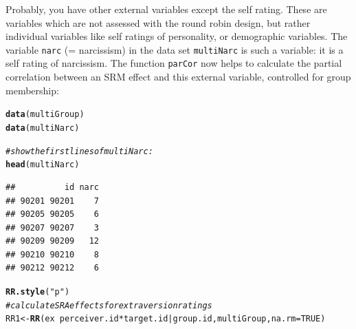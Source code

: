 \documentclass[a4paper]{article}\usepackage[]{graphicx}\usepackage[]{color}
\makeatletter
\newcommand{\hlnum}[1]{\textcolor[rgb]{0.686,0.059,0.569}{#1}}%
\newcommand{\hlstr}[1]{\textcolor[rgb]{0.192,0.494,0.8}{#1}}%
\newcommand{\hlcom}[1]{\textcolor[rgb]{0.678,0.584,0.686}{\textit{#1}}}%
\newcommand{\hlopt}[1]{\textcolor[rgb]{0,0,0}{#1}}%
\newcommand{\hlstd}[1]{\textcolor[rgb]{0.345,0.345,0.345}{#1}}%
\newcommand{\hlkwb}[1]{\textcolor[rgb]{0.69,0.353,0.396}{#1}}%
\newcommand{\hlkwc}[1]{\textcolor[rgb]{0.333,0.667,0.333}{#1}}%
\newcommand{\hlkwd}[1]{\textcolor[rgb]{0.737,0.353,0.396}{\textbf{#1}}}%
\newenvironment{kframe}{%
 \def\at@end@of@kframe{}%
 \ifinner\ifhmode%
  \def\at@end@of@kframe{\end{minipage}}%
  \begin{minipage}{\columnwidth}%
 \fi\fi%
 \def\FrameCommand##1{\hskip\@totalleftmargin \hskip-\fboxsep
 \colorbox{shadecolor}{##1}\hskip-\fboxsep
     \hskip-\linewidth \hskip-\@totalleftmargin \hskip\columnwidth}%
 \MakeFramed {\advance\hsize-\width
   \@totalleftmargin\z@ \linewidth\hsize
   \@setminipage}}%
 {\par\unskip\endMakeFramed%
 \at@end@of@kframe}
\newenvironment{knitrout}{}{} %
\makeatother
\begin{document}
Probably, you have other external variables except the self rating. These are variables which are not assessed with the round robin design, but rather individual variables like self ratings of personality, or demographic variables. The variable \texttt{narc} (= narcissism) in the data set \texttt{multiNarc} is such a variable: it is a self rating of narcissism. The function \texttt{parCor} now helps to calculate the partial correlation between an SRM effect and this external variable, controlled for group membership:

\begin{knitrout}\small
{}\color{fgcolor}\begin{kframe}
\begin{alltt}
\hlkwd{data}\hlstd{(multiGroup)}
\hlkwd{data}\hlstd{(multiNarc)}

\hlcom{# show the first lines of multiNarc:}
\hlkwd{head}\hlstd{(multiNarc)}
\end{alltt}
\begin{verbatim}
##          id narc
## 90201 90201    7
## 90205 90205    6
## 90207 90207    3
## 90209 90209   12
## 90210 90210    8
## 90212 90212    6
\end{verbatim}
\begin{alltt}
\hlkwd{RR.style}\hlstd{(}\hlstr{"p"}\hlstd{)}
\hlcom{# calculate SRA effects for extraversion ratings}
\hlstd{RR1} \hlkwb{<-} \hlkwd{RR}\hlstd{(ex} \hlopt{~} \hlstd{perceiver.id} \hlopt{*} \hlstd{target.id} \hlopt{|} \hlstd{group.id, multiGroup,} \hlkwc{na.rm} \hlstd{=} \hlnum{TRUE}\hlstd{)}
\end{alltt}


{\ttfamily\noindent\color{warningcolor}{\#\# Warning: ex : \ 4 \ participant(s) have been excluded from group 2 due to exceedingly missing data; id(s) = 90202, 90204, 90208, 90217 .}}

{\ttfamily\noindent\color{warningcolor}{\#\# Warning: ex : \ 3 \ participant(s) have been excluded from group 5 due to exceedingly missing data; id(s) = 90509, 90504, 90521 .}}

{\ttfamily\noindent\color{warningcolor}{\#\# Warning: ex : \ 4 \ participant(s) have been excluded from group 6 due to exceedingly missing data; id(s) = 90606, 90608, 90614, 90616 .}}

{\ttfamily\noindent\color{warningcolor}{\#\# Warning: ex : \ 1 \ participant(s) have been excluded from group 8 due to exceedingly missing data; id(s) = 90811 .}}


\end{kframe}
\end{knitrout}
\end{document}
